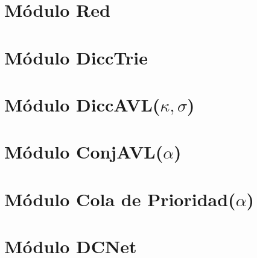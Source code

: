 \documentclass[a4paper,10pt, nofootinbib]{article}
\begin{document}
\clearpage


\section{Módulo Red}

\clearpage

\section{Módulo DiccTrie}

\clearpage

\section{Módulo DiccAVL($\kappa, \sigma$)}

\clearpage

\section{Módulo ConjAVL($\alpha$)}

\clearpage


\section{Módulo Cola de Prioridad($\alpha$)}

\clearpage

\section{Módulo DCNet}


\clearpage
\end{document}
